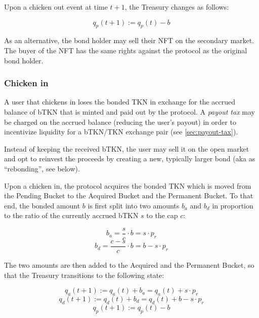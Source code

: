 \documentclass{article}
\begin{document}
Upon a chicken out event at time $t+1$, the Treasury changes as follows:

\begin{equation}
  \label{eq:chicken-out-transition}
    q_p(t+1) := q_p(t) - b
\end{equation}

As an alternative, the bond holder may sell their NFT on the secondary market. The buyer of the NFT has the same rights against the protocol as the original bond holder.

\subsubsection{Chicken in}
\label{sec:chicken-in}
A user that chickens in loses the bonded TKN in exchange for the accrued balance of bTKN that is minted and paid out by the protocol. A \textit{payout tax} may be charged on the accrued balance (reducing the user’s payout) in order to incentivize liquidity for a bTKN/TKN exchange pair (see \ref{sec:payout-tax}).

Instead of keeping the received bTKN, the user may sell it on the open market and opt to reinvest the proceeds by creating a new, typically larger bond (aka as “rebonding”, see below).

Upon a chicken in, the protocol acquires the bonded TKN which is moved from the Pending Bucket to the Acquired Bucket and the Permanent Bucket. To that end, the bonded amount $b$ is first split into two amounts $b_a$ and $b_d$ in proportion to the ratio of the currently accrued bTKN $s$ to the cap $c$:

\begin{equation}
  \label{eq:chicken-in-ba}
    b_a = \frac{s}{c} \cdot b = s \cdot p_r
\end{equation}
\begin{equation}
  \label{eq:chicken-in-bd}
    b_d = \frac{c-s}{c} \cdot b = b - s \cdot p_r
\end{equation}

The two amounts are then added to the Acquired and the Permanent Bucket, so that the Treasury transitions to the following state:

\begin{equation}
  \label{eq:chicken-in-qa}
    q_a(t+1) := q_a(t) + b_a = q_a(t) + s \cdot p_r
\end{equation}
\begin{equation}
  \label{eq:chicken-in-qd}
    q_d(t+1) := q_d(t) + b_d = q_d(t) + b - s \cdot p_r
\end{equation}
\begin{equation}
  \label{eq:chicken-in-qp}
    q_p(t+1) := q_p(t) - b
\end{equation}
\end{document}
